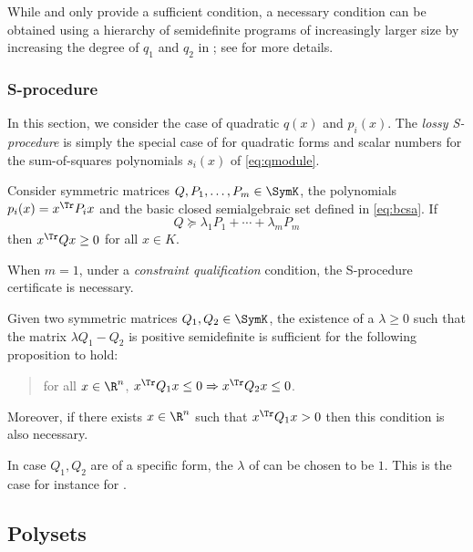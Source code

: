 \documentclass[11pt,twoside,a4paper,openright]{uclouvain-thesis}
\begin{document}
\begin{myrem}
  \label{rem:copos}
  While  and  only provide a sufficient condition,
  a necessary condition can be obtained using a hierarchy of
  semidefinite programs of increasingly larger size by increasing the degree of $q_1$ and $q_2$ in ; see \cite[Chapter~5]{parrilo2000structured} for more details.
\end{myrem}


\subsubsection{S-procedure}

In this section, we consider the case of quadratic $q(x)$ and $p_i(x)$.
The \emph{lossy S-procedure} is simply the special case of 
for quadratic forms and scalar numbers for the sum-of-squares polynomials
$s_i(x)$ of \eqref{eq:qmodule}.
\begin{myprop}
  \label{prop:lossysproc}
  Consider symmetric matrices $Q, P_1, \ldots, P_m \in \SymK$, the polynomials
  $p_i(x) = x^\Tr P_i x$ and the basic closed semialgebraic set defined in \eqref{eq:bcsa}.
  If
  \[ Q \succeq \lambda_1 P_1 + \cdots + \lambda_m P_m \]
  then $x^\Tr Q x \ge 0$ for all $x \in K$.
\end{myprop}

When $m = 1$, under a \emph{constraint qualification} condition,
the S-procedure certificate is necessary.

\begin{mytheo}
  \label{prop:sproc}
  Given two symmetric matrices $Q_1, Q_2 \in \SymK$,
  the existence of a $\lambda \geq 0$ such that the matrix $\lambda Q_{1} - Q_{2}$ is positive semidefinite
  is sufficient for the following proposition to hold:
  \begin{quote}
    for all $x \in \R^n$, $x^\Tr Q_1 x \leq 0 \Rightarrow x^\Tr Q_2 x \leq 0$.
  \end{quote}
  Moreover, if there exists $x \in \R^n$ such that $x^\Tr Q_1 x > 0$ then this condition is also necessary.
\end{mytheo}

In case $Q_1, Q_2$ are of a specific form, the $\lambda$ of 
can be chosen to be $1$.
This is the case for instance for .

\subsection{Polysets}
\end{document}
